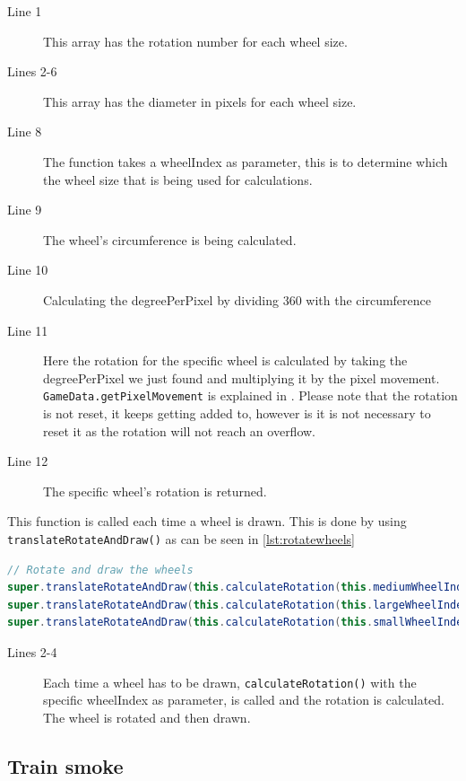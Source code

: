 \begin{description}
\item[Line 1] This array has the rotation number for each wheel size.
\item[Lines 2-6] This array has the diameter in pixels for each wheel size. 
\item[Line 8] The function takes a wheelIndex as parameter, this is to determine which the wheel size that is being used for calculations. 
\item[Line 9] The wheel's circumference is being calculated.
\item[Line 10] Calculating the degreePerPixel by dividing 360 with the circumference
\item[Line 11] Here the rotation for the specific wheel is calculated by taking the degreePerPixel we just found and multiplying it by the pixel movement. \lstinline|GameData.getPixelMovement| is explained in . Please note that the rotation is not reset, it keeps getting added to, however is it is not necessary to reset it as the rotation will not reach an overflow.
\item[Line 12] The specific wheel's rotation is returned. 
\end{description}

This function is called each time a wheel is drawn. This is done by using \lstinline|translateRotateAndDraw()| as can be seen in \autoref{lst:rotatewheels}

\begin{lstlisting}[language=java,firstnumber=1,caption={Rotating and drawing the wheels.},label=lst:rotatewheels]
// Rotate and draw the wheels
super.translateRotateAndDraw(this.calculateRotation(this.mediumWheelIndex), this.mediumWheel);
super.translateRotateAndDraw(this.calculateRotation(this.largeWheelIndex), this.largeWheel);
super.translateRotateAndDraw(this.calculateRotation(this.smallWheelIndex), this.smallWheel);
\end{lstlisting}

\begin{description}
\item[Lines 2-4] Each time a wheel has to be drawn, \lstinline|calculateRotation()| with the specific wheelIndex as parameter, is called and the rotation is calculated. The wheel is rotated and then drawn. 
\end{description}

\subsection{Train smoke}


